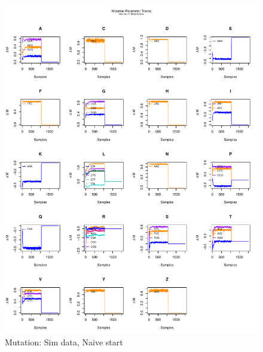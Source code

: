 \documentclass[11pt]{labbook}
\begin{document}
    \begin{figure}
        \centering
        \includegraphics[scale=.65]{FONSE_Plots/2016/October_17/simulated_naive_mut}
        \caption{Mutation: Sim data, Naive start}
        \label{fig:OCT17_S.N.MUT}
    \end{figure}
\end{document}
